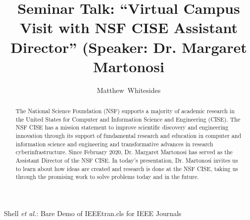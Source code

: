 \documentclass[journal,onecolumn]{IEEEtran}
\begin{document}
%
\title{Seminar Talk: ``Virtual Campus Visit with NSF CISE Assistant Director'' (Speaker: Dr. Margaret Martonosi}

%
%
%
\author{Matthew~Whitesides}%

%
{Shell \MakeLowercase{\textit{et al.}}: Bare Demo of IEEEtran.cls for IEEE Journals}

\maketitle

\begin{abstract}
  The National Science Foundation (NSF) supports a majority of academic research in the United States for Computer and Information Science and Engineering (CISE). The NSF CISE has a mission statement to improve scientific discovery and engineering innovation through its support of fundamental research and education in computer and information science and engineering and transformative advances in research cyberinfrastructure. Since February 2020, Dr. Margaret Martonosi has served as the Assistant Director of the NSF CISE. In today's presentation, Dr. Martonosi invites us to learn about how ideas are created and research is done at the NSF CISE, taking us through the promising work to solve problems today and in the future. 
\end{abstract}

\end{document}
